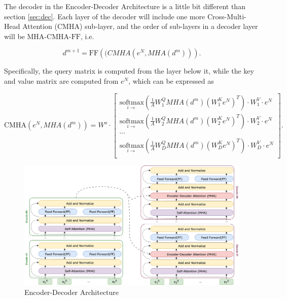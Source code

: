 The decoder in the Encoder-Decoder Architecture is a little bit different than section \ref{sec:dec}. Each layer of the decoder will include one more Cross-Multi-Head Attention (CMHA) sub-layer, and the order of sub-layers in a decoder layer will be $\mathrm{MHA}$-$\mathrm{CMHA}$-$\mathrm{FF}$, i.e.

\begin{equation}
    d^{m+1} = \mathrm{FF}(\mathrm(CMHA(e^N, MHA(d^m))).
\end{equation}

Specifically, the query matrix is computed from the layer below it, while the key and value matrix are computed from $e^N$, which can be expressed as

\begin{equation}
    \mathrm{CMHA}(e^N, MHA(d^m)) = W^o \cdot
\begin{bmatrix}
    \underset{i \rightarrow}{\mathrm{softmax}}\left( \frac{1}{A} W^Q_1 MHA(d^m) \left(W^K_1 e^N\right)^T \right) \cdot W^V_1 \cdot e^N \\
    \underset{i \rightarrow}{\mathrm{softmax}}\left( \frac{1}{A} W^Q_2 MHA(d^m) \left(W^K_2 e^N\right)^T \right) \cdot W^V_2 \cdot e^N \\
    \cdots\\
    \underset{i \rightarrow}{\mathrm{softmax}}\left( \frac{1}{A} W^Q_D MHA(d^m) \left(W^K_D e^N\right)^T \right) \cdot W^V_D \cdot e^N \\
\end{bmatrix}\nonumber.
\end{equation}


\begin{figure}[h]
    \centering
    \includegraphics[width=16cm]{pages/imgs/encoder_decoder.png}
    \caption{Encoder-Decoder Architecture}
    \label{fig:encoder_decoder}
\end{figure}


